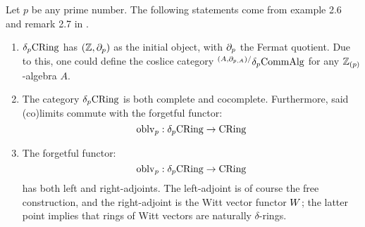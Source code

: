         \begin{proposition} \label{prop: (co)limits_of_delta_rings}
            Let $p$ be any prime number. The following statements come from example 2.6 and remark 2.7 in \cite{bhatt_scholze_prisms}.
            \begin{enumerate}
                \item $\delta_p\mathrm{CRing}$ has $(\mathbb{Z}, \partial_p)$ as the initial object, with $\partial_p$ the Fermat quotient. Due to this, one could define the coslice category ${}^{(A, \partial_{p,A})/}\delta_p\mathrm{Comm}\mathrm{Alg}$ for any $\mathbb{Z}_{(p)}$-algebra $A$. 
                \item The category $\delta_p\mathrm{CRing}$ is both complete and cocomplete. Furthermore, said (co)limits commute with the forgetful functor:
                    $$\mathrm{oblv}_p: \delta_p\mathrm{CRing} \to \mathrm{CRing}$$
                \item The forgetful functor:
                    $$\mathrm{oblv}_p: \delta_p\mathrm{CRing} \to \mathrm{CRing}$$
                has both left and right-adjoints. The left-adjoint is of course the free construction, and the right-adjoint is the Witt vector functor $W$; the latter point implies that rings of Witt vectors are naturally $\delta$-rings.
            \end{enumerate}
        \end{proposition}

